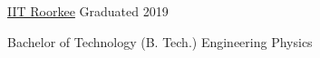 
\vspace{-2mm}
\timedsubsection
  {\href{https://www.iitr.ac.in/}{IIT Roorkee}}
  {Graduated 2019}

\vspace{-1mm}
\begin{sectiondescription}
  Bachelor of Technology (B. Tech.) \hfill Engineering Physics~\iconAtom\\%
\end{sectiondescription}